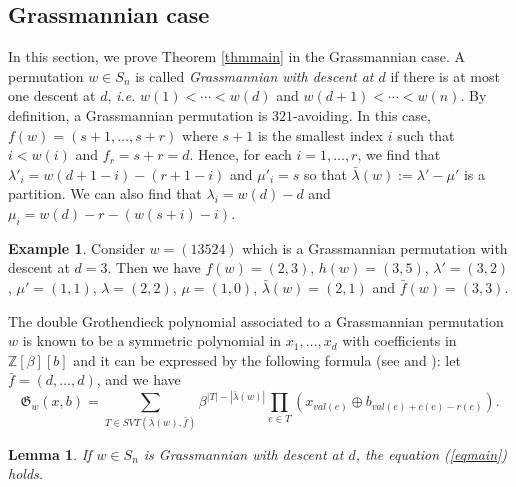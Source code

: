 \documentclass[11pt,reqno,sumlimits]{amsart}
\newcommand{\ZZ}{{\mathbb Z}}
\newcommand{\frakG}{{\mathfrak G}}
\newcommand{\FSVT}{{SVT}}
\newtheorem{lem}[thm]{Lemma}
\theoremstyle{definition}
\newtheorem{exm}[thm]{Example}
\numberwithin{equation}{section}
\begin{document}
\subsection{Grassmannian case}
In this section, we prove Theorem \ref{thmmain} in the Grassmannian case. A permutation $w\in S_n$ is called {\it Grassmannian with descent at $d$} if there is at most one descent at $d$, {\it i.e.} $w(1)<\cdots < w(d)$ and $w(d+1)<\cdots<w(n)$. By definition, a Grassmannian permutation is $321$-avoiding. In this case, $f(w)=(s+1,\dots, s+r)$ where $s+1$ is the smallest index $i$ such that $i<w(i)$ and $f_r=s+r=d$. Hence, for each $i=1,\dots, r$, we find that $\lambda'_i=w(d+1-i)-(r+1-i)$ and $\mu'_i=s$ so that $\bar\lambda(w):=\lambda'-\mu'$ is a partition. We can also find that $\lambda_i = w(d)-d$ and $\mu_i=w(d)-r - (w(s+i)-i)$. 
\begin{exm}
Consider $w=(13524)$ which is a Grassmannian permutation with descent at $d=3$. Then we have $f(w)=(2,3)$, $h(w)=(3,5)$, $\lambda'=%
(3,2)
$,
$\mu'=(1,1)$, $\lambda=(2,2)$, $\mu%
= (1,0)$, $\bar\lambda(w)=(2,1)$ and $\bar f(w)=(3,3)$.
\end{exm}
The double Grothendieck polynomial associated to a Grassmannian permutation $w$ is known to be a symmetric polynomial in $x_1,\dots, x_d$ with coefficients in $\ZZ[\beta][b]$ and it can be expressed by the following formula (see \cite{BuchLRrule} and \cite{McNamara}): let $\bar f =(d,\dots, d)$, and we have
\begin{equation}\label{eqGr}
\frakG_w(x,b) = \sum_{T \in \FSVT(\bar\lambda(w), \bar f)} \beta^{|T| - |\bar\lambda(w)|} \prod_{e\in T} (x_{val(e)}\oplus b_{val(e) + c(e)-r(e)}).
\end{equation}
\begin{lem}\label{thmGr}
If $w\in S_n$ is Grassmannian with descent at $d$, the equation (\ref{eqmain}) holds.
\end{lem}
\end{document}
